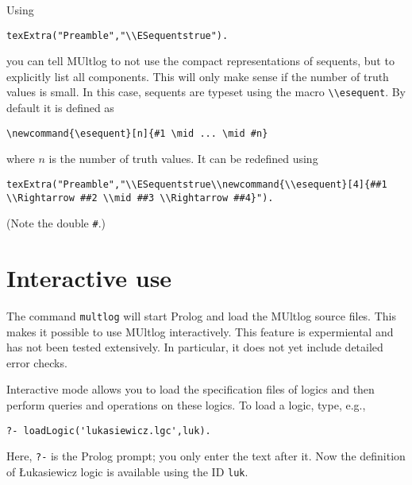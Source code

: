 \documentclass[]{article}
\newcommand{\passthrough}[1]{#1}
\begin{document}
Using

\begin{lstlisting}
texExtra("Preamble","\\ESequentstrue").
\end{lstlisting}

you can tell MUltlog to not use the compact representations of sequents,
but to explicitly list all components. This will only make sense if the
number of truth values is small. In this case, sequents are typeset
using the macro \passthrough{\lstinline!\\esequent!}. By default it is
defined as

\begin{lstlisting}
\newcommand{\esequent}[n]{#1 \mid ... \mid #n}
\end{lstlisting}

where \(n\) is the number of truth values. It can be redefined using

\begin{lstlisting}
texExtra("Preamble","\\ESequentstrue\\newcommand{\\esequent}[4]{##1 \\Rightarrow ##2 \\mid ##3 \\Rightarrow ##4}").
\end{lstlisting}

(Note the double \passthrough{\lstinline!#!}.)

\hypertarget{interactive-use}{%
\section{Interactive use}\label{interactive-use}}

The command \passthrough{\lstinline!multlog!} will start Prolog and load
the MUltlog source files. This makes it possible to use MUltlog
interactively. This feature is expermiental and has not been tested
extensively. In particular, it does not yet include detailed error
checks.

Interactive mode allows you to load the specification files of logics
and then perform queries and operations on these logics. To load a
logic, type, e.g.,

\begin{lstlisting}
?- loadLogic('lukasiewicz.lgc',luk).
\end{lstlisting}

Here, \passthrough{\lstinline!?-!} is the Prolog prompt; you only enter
the text after it. Now the definition of Łukasiewicz logic is available
using the ID \passthrough{\lstinline!luk!}.
\end{document}
